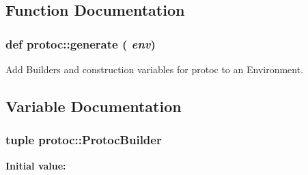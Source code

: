 \subsection{Function Documentation}
\hypertarget{namespaceprotoc_ad49cf73a0ff7f84b18cbcfbf8d76de0d}{
\subsubsection[{generate}]{\setlength{\rightskip}{0pt plus 5cm}def protoc::generate ( {\em env})}}
\label{namespaceprotoc_ad49cf73a0ff7f84b18cbcfbf8d76de0d}
\begin{DoxyVerb}Add Builders and construction variables for protoc to an Environment.\end{DoxyVerb}
 

\subsection{Variable Documentation}
\hypertarget{namespaceprotoc_a111c74671afe293add0dbdbab0a89f53}{
\subsubsection[{ProtocBuilder}]{\setlength{\rightskip}{0pt plus 5cm}tuple protoc::ProtocBuilder}}
\label{namespaceprotoc_a111c74671afe293add0dbdbab0a89f53}
{\bfseries Initial value:}
